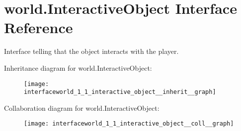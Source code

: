 \hypertarget{interfaceworld_1_1_interactive_object}{\section{world.\-Interactive\-Object Interface Reference}
\label{interfaceworld_1_1_interactive_object}
}


Interface telling that the object interacts with the player.  




Inheritance diagram for world.\-Interactive\-Object\-:
\nopagebreak
\begin{figure}[H]
\begin{center}
\leavevmode
\texttt{[image: interfaceworld\_1\_1\_interactive\_object\_\_inherit\_\_graph]}
\end{center}
\end{figure}


Collaboration diagram for world.\-Interactive\-Object\-:
\nopagebreak
\begin{figure}[H]
\begin{center}
\leavevmode
\texttt{[image: interfaceworld\_1\_1\_interactive\_object\_\_coll\_\_graph]}
\end{center}
\end{figure}
